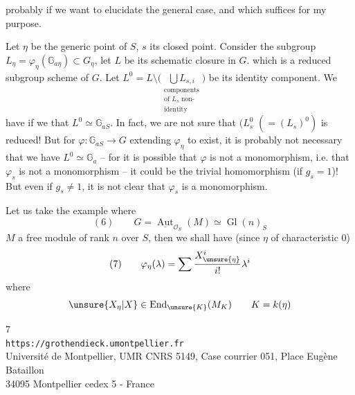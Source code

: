 
 probably if we want to elucidate the general case, and which suffices for
my purpose.

Let $\eta$ be the generic point of $S$, $s$ its closed point. Consider the
subgroup $L_\eta=\varphi_\eta(\mathbb G_{a\eta})\subset G_\eta$,
let $L$ be its schematic closure in $G$. which is a reduced subgroup scheme
of $G$. Let 
$L^0=L\setminus
\bigl(\underset{\substack{\text{components}\\\text{of }L_s\text{ non-}\\\text{identity}}}{\bigcup L_{s,i}}\bigr)$
be its identity component. We have  if we  that
$L^0\simeq\mathbb G_{aS}$. In fact, we are not
 sure that
$(L_s^0$  $(=(L_s)^0)$ is reduced!
But for $\varphi:\mathbb G_{aS}\longrightarrow G$
 extending $\varphi_\eta$ to exist, it is probably not necessary
that we have $L^0\simeq\mathbb G_a$ -- for it is possible that
$\varphi$ is not a monomorphism, i.e. that $\varphi_s$ is not a monomorphism --
it could  be the trivial homomorphism
(if $g_s=1$)! But even if $g_s\ne1$, it is not clear that
$\varphi_s$ is a monomorphism.

Let us take the example where
\[
(6)\qquad G=\underline{\operatorname{Aut}}_{\mathcal O_S}(M)
\simeq\operatorname{Gl}(n)_S
\]
$M$ a  free module of rank $n$ over $S$,
then we shall have (since $\eta$ of characteristic $0$)
\[
(7)\qquad
\varphi_\eta(\lambda)=\sum\frac{X^{i}_{\unsure{\eta}}}{i!}\lambda^i
\]
where
\[
\unsure{X_\eta|X}\in\operatorname{End}_{\unsure{K}}(M_K)
\qquad K=k(\eta)
\]

\begin{center}
\small
7\\
\texttt{https://grothendieck.umontpellier.fr}\\
Université de Montpellier, UMR CNRS 5149, Case courrier 051, Place Eugène Bataillon\\
34095 Montpellier cedex 5 - France
\end{center}


